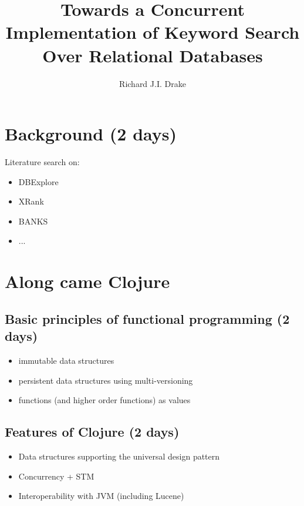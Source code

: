 \documentclass[grad]{uoit-thesis}
\author{Richard J.I. Drake}
\title{Towards a Concurrent Implementation of Keyword Search Over Relational Databases}
\begin{document}
	
	
	
	\begin{preliminary}
		\maketitle

		\setcounter{page}{3}

		\tableofcontents

		\listoftables
		\listoffigures
		\listofalgorithms
		\printglossaries
	\end{preliminary}
	
	\chapter{Background (2 days)}
		Literature search on:

		\begin{itemize}
			\item DBExplore
			\item XRank
			\item BANKS
			\item ...
		\end{itemize}
	
	
	
	\chapter{Along came Clojure}
		\section{Basic principles of functional programming (2 days)}
			\begin{itemize}
				\item immutable data structures
				\item persistent data structures using multi-versioning
				\item functions (and higher order functions) as values
			\end{itemize}
		
		\section{Features of Clojure (2 days)}
			\begin{itemize}
				\item Data structures supporting the universal design pattern
				\item Concurrency + STM
				\item Interoperability with JVM (including Lucene)
			\end{itemize}
\end{document}
